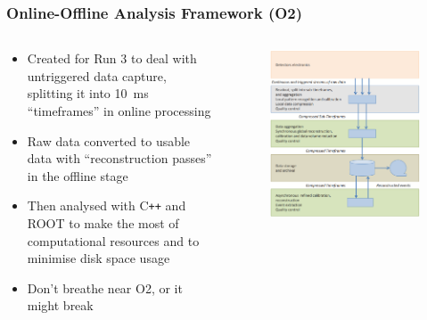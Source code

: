 \documentclass[10pt]{beamer}
\begin{document}
\begin{frame}
    \frametitle{Online-Offline Analysis Framework (O2)}

    \begin{columns}[c]
        \begin{column}{0.6\textwidth}
            \begin{itemize}
                \item Created for Run 3 to deal with untriggered data capture, splitting it into \SI{10}{\milli\second} ``timeframes'' in online processing
                \item Raw data converted to usable data with ``reconstruction passes'' in the offline stage
                \item Then analysed with C\texttt{++} and ROOT to make the most of computational resources and to minimise disk space usage
                \item Don't breathe near O2, or it might break
            \end{itemize}
        \end{column}

        \begin{column}{0.4\textwidth}
            \begin{figure}
                \begin{center}
                    \includegraphics[width=\textwidth]{Figs/O2_flow.png}
                \end{center}
            \end{figure}
        \end{column}
    \end{columns}

\end{frame}
\end{document}
